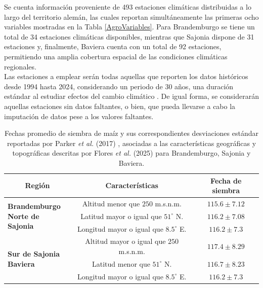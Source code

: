 Se cuenta información proveniente de 493 estaciones climáticas distribuidas a lo largo del territorio alemán, las cuales reportan simultáneamente las primeras ocho variables mostradas en la Tabla \ref{AgroVariables}. Para Brandemburgo se tiene un total de 34 estaciones climáticas disponibles, mientras que Sajonia dispone de 31 estaciones y, finalmente, Baviera cuenta con un total de 92 estaciones, permitiendo una amplia cobertura espacial de las condiciones climáticas regionales.\\


Las estaciones a emplear serán todas aquellas que reporten los datos históricos desde 1994 hasta 2024, considerando un periodo de 30 años, una duración estándar al estudiar efectos del cambio climático \cite{Hennemuth_2013}. De igual forma, se considerarán aquellas estaciones sin datos faltantes, o bien, que pueda llevarse a cabo la imputación de datos pese a los valores faltantes.\\ 

\begin{table}[H]
	\centering
	\begin{tabular}{l|c|c}
		\hline
		\multicolumn{1}{c|}{\textbf{Región}} & \textbf{Características} & \textbf{Fecha de siembra} \\ \hline
		
		\multirow{3}{*}{\parbox{4.5cm}{\textbf{Brandemburgo}\\ \textbf{Norte de Sajonia}}} 
		& Altitud menor que $250$ m.s.n.m. 
		& $115.6 \pm 7.12$ \\ \cline{2-3}
		
		
		& Latitud mayor o igual que $51^\circ$ N. 
		& $116.2 \pm 7.08$ \\ \cline{2-3}
		
		& Longitud mayor o igual que $8.5^\circ$ E. 
		& $116.2 \pm 7.3$ \\ \hline
		
		
		\multirow{3}{*}{\parbox{4.5cm}{\textbf{Sur de Sajonia}\\ \textbf{Baviera}}}  
		& Altitud mayor o igual que $250$ m.s.n.m. 
		& $117.4 \pm 8.29$ \\ \cline{2-3}
		
		
		& Latitud menor que $51^\circ$ N. 
		& $116.7 \pm 8.23$ \\ \cline{2-3}
		
		& Longitud mayor o igual que $8.5^\circ$ E. 
		& $116.2 \pm 7.3$ \\ \hline
		
	\end{tabular}
	\caption{Fechas promedio de siembra de maíz y sus correspondientes desviaciones estándar reportadas por Parker \textit{et al.} (2017) \cite{Parker_2016}, asociadas a las características geográficas y topográficas descritas por Flores \textit{et al.} (2025) \cite{Flores_2025} para Brandemburgo, Sajonia y Baviera.}
	\label{Real_data}
\end{table}

